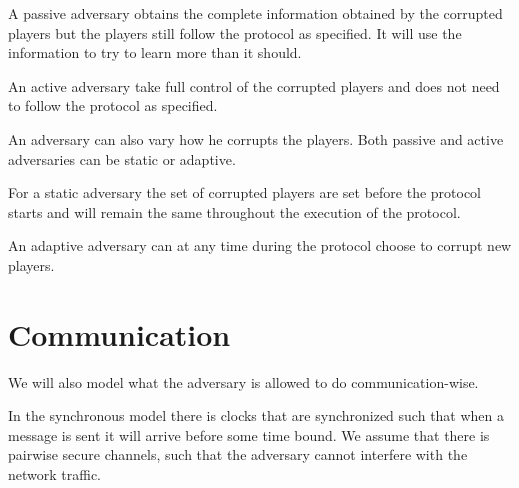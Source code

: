 \begin{mydef}
A passive adversary obtains the complete information obtained by the corrupted players but the players still follow the protocol as specified. It will use the information to try to learn more than it should.
\end{mydef}

\begin{mydef}
An active adversary take full control of the corrupted players and does not need to follow the protocol as specified.
\end{mydef}

An adversary can also vary how he corrupts the players. Both passive and active adversaries can be static or adaptive.

\begin{mydef}
For a static adversary the set of corrupted players are set before the protocol starts and will remain the same throughout the execution of the protocol.
\end{mydef}

\begin{mydef}
An adaptive adversary can at any time during the protocol choose to corrupt new players.
\end{mydef}

\section{Communication} 
We will also model what the adversary is allowed to do communication-wise.

\begin{mydef}
In the synchronous model there is clocks that are synchronized such that when a message is sent it will arrive before some time bound. We assume that there is pairwise secure channels, such that the adversary cannot interfere with the network traffic.
\end{mydef}

